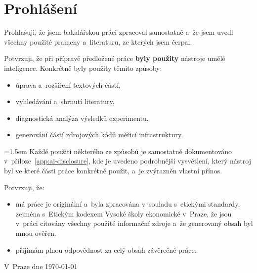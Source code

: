 \hypersetup{pageanchor=true}
\cleardoublepage
\pagestyle{plain}
\openright
\vspace*{\fill}

\section*{Prohlášení}

Prohlašuji, že jsem bakalářskou práci zpracoval samostatně a~že jsem uvedl
všechny použité prameny a~literaturu, ze kterých jsem čerpal.

Potvrzuji, že při přípravě předložené práce \textbf{byly použity} nástroje
umělé inteligence. Konkrétně byly použity těmito způsoby:

\begin{itemize}
    \item úprava a~rozšíření textových částí,
    \item vyhledávání a~shrnutí literatury,
    \item diagnostická analýza výsledků experimentu,
    \item generování částí zdrojových kódů měřicí infrastruktury.
\end{itemize}

{\leftskip=1.5em
Každé použití některého ze způsobů je samostatně dokumentováno
v~příloze~\ref{app:ai-disclosure}, kde je uvedeno podrobnější
vysvětlení, který nástroj byl ve které části práce konkrétně
použit, a~je zvýrazněn vlastní přínos.

Potvrzuji, že:
\begin{itemize}
    \item má práce je originální a~byla zpracována v~souladu s~etickými
          standardy, zejména s~Etickým kodexem Vysoké školy ekonomické
          v~Praze, že jsou v~práci citovány všechny použité informační
          zdroje a~že generovaný obsah byl mnou ověřen.
    \item přijímám plnou odpovědnost za celý obsah závěrečné práce.
\end{itemize}
}

\vspace{10mm}

V~Praze dne \today\hfill
\begin{minipage}[t]{0.4\textwidth}
\centering
\AutorPrace
\end{minipage}

\vspace{1cm}
